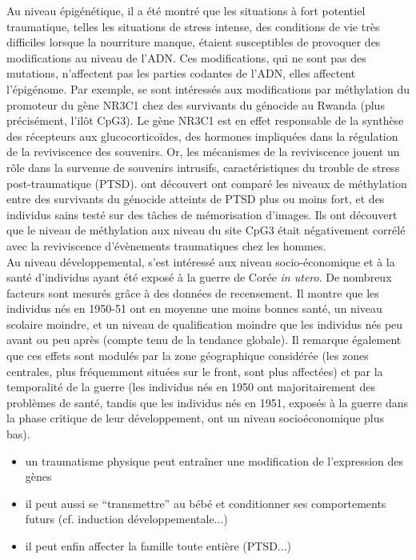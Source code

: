 \documentclass[french]{article}
\begin{document}
			Au niveau épigénétique, il a été montré que les situations à fort potentiel traumatique, telles les situations de stress intense, des conditions de vie très difficiles lorsque la nourriture manque, étaient susceptibles de provoquer des modifications au niveau de l'ADN. Ces modifications, qui ne sont pas des mutations, n'affectent pas les parties codantes de l'ADN, elles affectent l'épigénome. Par exemple, \cite{vukojevic2014} se sont intéressés aux modifications par méthylation du promoteur du gène NR3C1 chez des survivants du génocide au Rwanda (plus précisément, l'ilôt CpG3). Le gène NR3C1 est en effet responsable de la synthèse des récepteurs aux glucocorticoïdes, des hormones impliquées dans la régulation de la reviviscence des souvenirs. Or, les mécanismes de la reviviscence jouent un rôle dans la survenue de souvenirs intrusifs, caractéristiques du trouble de stress post-traumatique (PTSD). \cite{vukojevic2014} ont découvert ont comparé les niveaux de méthylation entre des survivants du génocide atteints de PTSD plus ou moins fort, et des individus sains testé sur des tâches de mémorisation d'images. Ils ont découvert que le niveau de méthylation aux niveau du site CpG3 était négativement corrélé avec la reviviscence d'évènements traumatiques chez les hommes.\\
			
			Au niveau développemental, \cite{lee2014} s'est intéressé aux niveau socio-économique et à la santé d'individus ayant été exposé à la guerre de Corée \textit{in utero}. De nombreux facteurs sont mesurés grâce à des données de recensement. Il montre que les individus nés en 1950-51 ont en moyenne une moins bonnes santé, un niveau scolaire moindre, et un niveau de qualification moindre que les individus nés peu avant ou peu après (compte tenu de la tendance globale). Il remarque également que ces effets sont modulés par la zone géographique considérée (les zones centrales, plus fréquemment situées sur le front, sont plus affectées) et par la temporalité de la guerre (les individus nés en 1950 ont majoritairement des problèmes de santé, tandis que les individus nés en 1951, exposés à la guerre dans la phase critique de leur développement, ont un niveau socioéconomique plus bas).
			
			
		\begin{itemize}
			\item un traumatisme physique peut entraîner une modification de l'expression des gènes
			\item il peut aussi se ``transmettre'' au bébé et conditionner ses comportements futurs (cf. induction développementale...)
			\item il peut enfin affecter la famille toute entière (PTSD...)
		\end{itemize}
\end{document}
